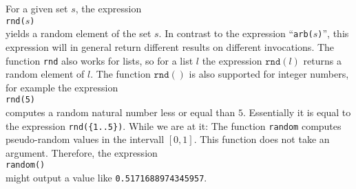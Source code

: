 For a given set $s$, the expression
\\[0.2cm]
\hspace*{1.3cm}
\texttt{rnd($s$)}
\\[0.2cm]
yields a random element of the set $s$.  
In contrast to the expression
``\texttt{arb($s$)}'',  this expression will in general return different results on
different invocations.  The function \texttt{rnd} also works for lists, so for a list $l$
the expression $\texttt{rnd}(l)$ returns a random element of $l$.
The function $\mathtt{rnd}()$ is also supported for integer numbers, for example the expression
\\[0.2cm]
\hspace*{1.3cm}
\texttt{rnd(5)}
\\[0.2cm]
computes a random natural number less or equal than $5$. Essentially it is equal to the expression
\texttt{rnd(\{1..5\})}.  While we are at it: The function \texttt{random} computes pseudo-random
values in the intervall $[0,1]$.  This function does not take an argument. Therefore, the expression
\\[0.2cm]
\hspace*{1.3cm}
\texttt{random()}
\\[0.2cm]
might output a value like \texttt{0.5171688974345957}. 



